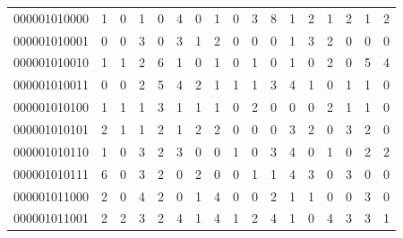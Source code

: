 \documentclass[10pt,a4paper]{article}
\begin{document}
\begin{longtable}{ |c|c|c|c|c|c|c|c|c|c|c|c|c|c|c|c|c| }
    000001010000              & 1                            & 0                                & 1                            & 0                              & 4   & 0   & 1   & 0   & 3   & 8   & 1   & 2   & 1   & 2   & 1   & 2   \\
    000001010001              & 0                            & 0                                & 3                            & 0                              & 3   & 1   & 2   & 0   & 0   & 0   & 1   & 3   & 2   & 0   & 0   & 0   \\
    000001010010              & 1                            & 1                                & 2                            & 6                              & 1   & 0   & 1   & 0   & 1   & 0   & 1   & 0   & 2   & 0   & 5   & 4   \\
    000001010011              & 0                            & 0                                & 2                            & 5                              & 4   & 2   & 1   & 1   & 1   & 3   & 4   & 1   & 0   & 1   & 1   & 0   \\
    000001010100              & 1                            & 1                                & 1                            & 3                              & 1   & 1   & 1   & 0   & 2   & 0   & 0   & 0   & 2   & 1   & 1   & 0   \\
    000001010101              & 2                            & 1                                & 1                            & 2                              & 1   & 2   & 2   & 0   & 0   & 0   & 3   & 2   & 0   & 3   & 2   & 0   \\
    000001010110              & 1                            & 0                                & 3                            & 2                              & 3   & 0   & 0   & 1   & 0   & 3   & 4   & 0   & 1   & 0   & 2   & 2   \\
    000001010111              & 6                            & 0                                & 3                            & 2                              & 0   & 2   & 0   & 0   & 1   & 1   & 4   & 3   & 0   & 3   & 0   & 0   \\
    000001011000              & 2                            & 0                                & 4                            & 2                              & 0   & 1   & 4   & 0   & 0   & 2   & 1   & 1   & 0   & 0   & 3   & 0   \\
    000001011001              & 2                            & 2                                & 3                            & 2                              & 4   & 1   & 4   & 1   & 2   & 4   & 1   & 0   & 4   & 3   & 3   & 1   \\

\end{longtable}
\end{document}
